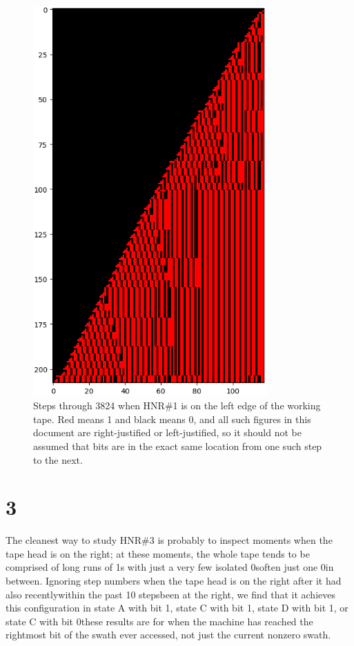 \documentclass[12pt]{article}
\begin{document}
\begin{figure}[H]
\centering
\includegraphics[width=0.8\textwidth]{1.png}
\caption{Steps through 3824 when HNR\#1 is on the left edge of the working tape.
Red means 1 and black means 0, and all such figures in this document are right-justified or left-justified,
so it should not be assumed that bits are in the exact same location from one such step to the next.}
\end{figure}

{}
\section*{3}
The cleanest way to study HNR\#3 is probably to inspect moments when the tape head is on the right; at these moments, the whole tape tends to be comprised of long runs of 1s with just a very few isolated 0s\textemdash often just one 0\textemdash in between. Ignoring step numbers when the tape head is on the right after it had also recently\textemdash within the past 10 steps\textemdash been at the right, we find that it achieves this configuration in state A with bit 1, state C with bit 1, state D with bit 1, or state C with bit 0\textemdash these results are for when the machine has reached the rightmost bit of the swath ever accessed, not just the current nonzero swath.
\end{document}
